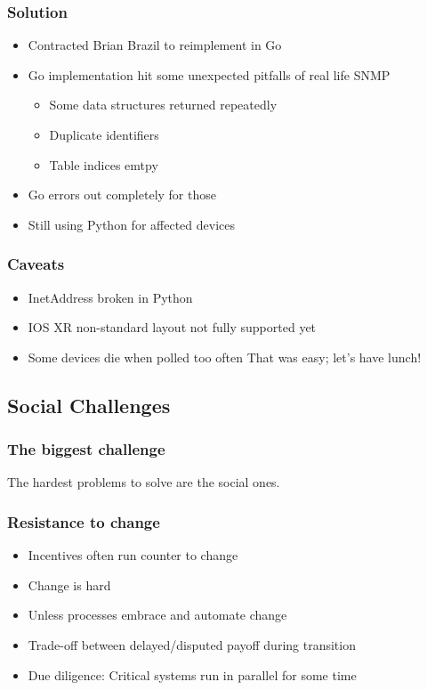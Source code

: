 \documentclass[t]{beamer}
\begin{document}
\begin{frame}
	\frametitle{Solution}
	\begin{itemize}
		\item Contracted Brian Brazil to reimplement in Go
		\item Go implementation hit some unexpected pitfalls of real life SNMP
		\begin{itemize}
			\item Some data structures returned repeatedly
			\item Duplicate identifiers
			\item Table indices emtpy
		\end{itemize}
		\item Go errors out completely for those
		\item Still using Python for affected devices
	\end{itemize}
\end{frame}

\begin{frame}
	\frametitle{Caveats}
	\begin{itemize}
		\item InetAddress broken in Python
		\item IOS XR non-standard layout not fully supported yet 
		\item Some devices die when polled too often
		\vfill
			That was easy; let's have lunch!
	\end{itemize}
\end{frame}


\subsection{Social Challenges}

\begin{frame}
	\frametitle{The biggest challenge}
		\begin{center}
			\vfill
			The hardest problems to solve are the social ones.
			\vfill
		\end{center}
\end{frame}

\begin{frame}
	\frametitle{Resistance to change}
	\begin{itemize}
		\item Incentives often run counter to change
		\item Change is hard
		\item Unless processes embrace and automate change
		\item Trade-off between delayed/disputed payoff during transition
		\item Due diligence: Critical systems run in parallel for some time
	\end{itemize}
\end{frame}
\end{document}
